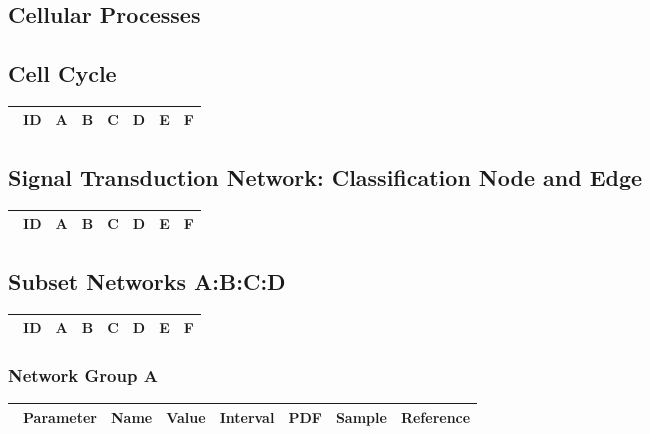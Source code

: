 \documentclass[preprint, 8pt]{elsarticle}
\theoremstyle{definition}
\begin{document}
\subsection{Cellular Processes}

\subsection{Cell Cycle}

\begin{table}[H]\centering
\begin{tabular}{p{1cm}p{1cm}p{1cm}p{1cm}p{1cm}p{1cm}p{4cm}}\
ID & A & B & C & D & E & F \\
\hline
\hline
\end{tabular}
\end{table}

\subsection{Signal Transduction Network: Classification Node and Edge}

\begin{table}[H]\centering
\begin{tabular}{p{1cm}p{1cm}p{1cm}p{1cm}p{1cm}p{1cm}p{4cm}}\
ID & A & B & C & D & E & F \\
\hline
\hline
\end{tabular}
\end{table}

\subsection{Subset Networks A:B:C:D}

\begin{table}[H]\centering
\begin{tabular}{p{1cm}p{1cm}p{1cm}p{1cm}p{1cm}p{1cm}p{4cm}}\
ID & A & B & C & D & E & F \\
\hline
\hline
\end{tabular}
\end{table}

\subsubsection{Network Group A}

\begin{table}[H]\centering
\begin{tabular}{p{1cm}p{1cm}p{1cm}p{1cm}p{1cm}p{1cm}p{4cm}}\
Parameter & Name & Value & Interval & PDF & Sample & Reference \\
\hline
\hline
\end{tabular}
\end{table}
\end{document}
